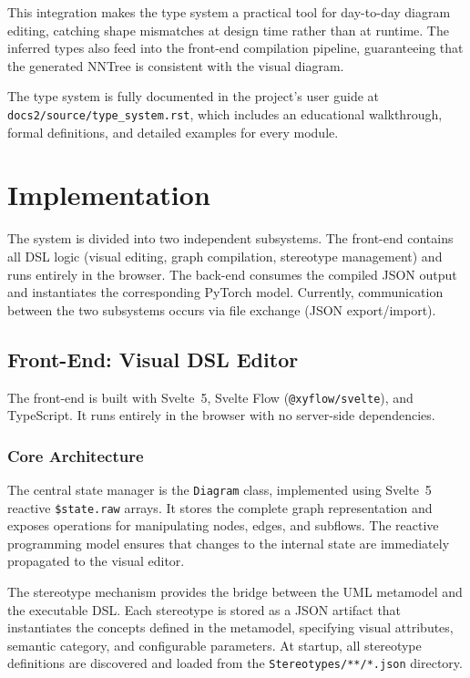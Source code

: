 \documentclass[11pt,a4paper]{article}
\begin{document}
This integration makes the type system a practical tool for day-to-day diagram editing, catching shape mismatches at design time rather than at runtime. The inferred types also feed into the front-end compilation pipeline, guaranteeing that the generated NNTree is consistent with the visual diagram.

The type system is fully documented in the project's user guide at \texttt{docs2/source/type\_system.rst}, which includes an educational walkthrough, formal definitions, and detailed examples for every module.

\pagebreak

\section{Implementation}

The system is divided into two independent subsystems. The front-end contains all DSL logic (visual editing, graph compilation, stereotype management) and runs entirely in the browser. The back-end consumes the compiled JSON output and instantiates the corresponding PyTorch model. Currently, communication between the two subsystems occurs via file exchange (JSON export/import).

\subsection{Front-End: Visual DSL Editor}

The front-end is built with Svelte~5, Svelte Flow (\texttt{@xyflow/svelte}), and TypeScript. It runs entirely in the browser with no server-side dependencies.

\subsubsection{Core Architecture}

The central state manager is the \texttt{Diagram} class, implemented using Svelte~5 reactive \texttt{\$state.raw} arrays. It stores the complete graph representation and exposes operations for manipulating nodes, edges, and subflows. The reactive programming model ensures that changes to the internal state are immediately propagated to the visual editor.

The stereotype mechanism provides the bridge between the UML metamodel and the executable DSL. Each stereotype is stored as a JSON artifact that instantiates the concepts defined in the metamodel, specifying visual attributes, semantic category, and configurable parameters. At startup, all stereotype definitions are discovered and loaded from the \texttt{Stereotypes/**/*.json} directory.
\end{document}

